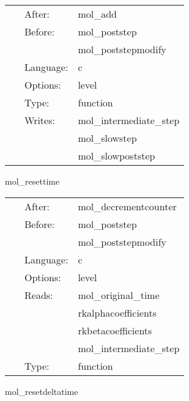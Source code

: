 \hspace{5mm}

 \begin{tabular*}{160mm}{cll} 
~ & After:  & mol\_add \\ 
~ & Before:  & mol\_poststep \\ 
~& ~ &mol\_poststepmodify\\ 
~ & Language:  & c \\ 
~ & Options:  & level \\ 
~ & Type:  & function \\ 
~ & Writes:  & mol\_intermediate\_step \\ 
~& ~ &mol\_slowstep\\ 
~& ~ &mol\_slowpoststep\\ 
\end{tabular*} 


\vspace{5mm}


\hspace{5mm} mol\_resettime 

\hspace{5mm}{\it if necessary, change the time } 


\hspace{5mm}

 \begin{tabular*}{160mm}{cll} 
~ & After:  & mol\_decrementcounter \\ 
~ & Before:  & mol\_poststep \\ 
~& ~ &mol\_poststepmodify\\ 
~ & Language:  & c \\ 
~ & Options:  & level \\ 
~ & Reads:  & mol\_original\_time \\ 
~& ~ &rkalphacoefficients\\ 
~& ~ &rkbetacoefficients\\ 
~& ~ &mol\_intermediate\_step\\ 
~ & Type:  & function \\ 
\end{tabular*} 


\vspace{5mm}


\hspace{5mm} mol\_resetdeltatime 

\hspace{5mm}{\it if necessary, change the timestep } 



